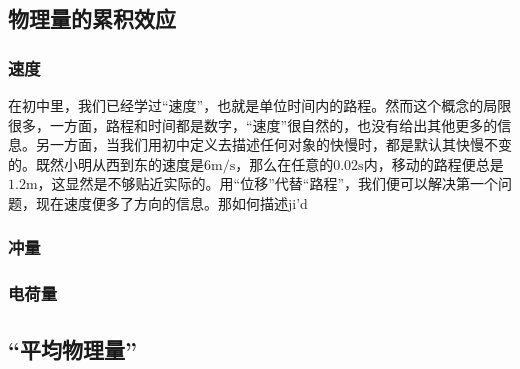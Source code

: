
\subsection{物理量的累积效应}
\subsubsection{速度}
在初中里，我们已经学过“速度”，也就是单位时间内的路程。然而这个概念的局限很多，一方面，路程和时间都是数字，“速度”很自然的，也没有给出其他更多的信息。另一方面，当我们用初中定义去描述任何对象的快慢时，都是默认其快慢不变的。既然小明从西到东的速度是$6 \mathrm{m/s}$，那么在任意的$0.02\mathrm s$内，移动的路程便总是$1.2\mathrm m$，这显然是不够贴近实际的。用“位移”代替“路程”，我们便可以解决第一个问题，现在速度便多了方向的信息。那如何描述ji'd
\subsubsection{冲量}
\subsubsection{电荷量}
\subsection{“平均物理量”}